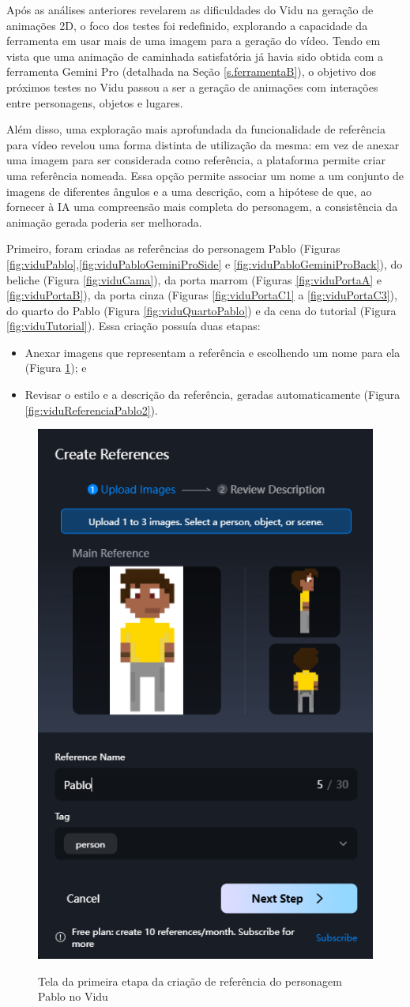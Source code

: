 

Após as análises anteriores revelarem as dificuldades do Vidu na geração de animações 2D, o foco dos testes foi redefinido, explorando a capacidade da ferramenta em usar mais de uma imagem para a geração do vídeo. Tendo em vista que uma animação de caminhada satisfatória já havia sido obtida com a ferramenta Gemini Pro (detalhada na Seção \ref{s.ferramentaB}), o objetivo dos próximos testes no Vidu passou a ser a geração de animações com interações entre personagens, objetos e lugares. 


Além disso, uma exploração mais aprofundada da funcionalidade de referência para vídeo revelou uma forma distinta de utilização da mesma: em vez de anexar uma imagem para ser considerada como referência, a plataforma permite criar uma referência nomeada. Essa opção permite associar um nome a um conjunto de imagens de diferentes ângulos e a uma descrição, com a hipótese de que, ao fornecer à IA uma compreensão mais completa do personagem, a consistência da animação gerada poderia ser melhorada.

Primeiro, foram criadas as referências do personagem Pablo (Figuras \ref{fig:viduPablo},\ref{fig:viduPabloGeminiProSide} e \ref{fig:viduPabloGeminiProBack}), do beliche (Figura \ref{fig:viduCama}), da porta marrom (Figuras \ref{fig:viduPortaA} e \ref{fig:viduPortaB}), da porta cinza (Figuras \ref{fig:viduPortaC1} a \ref{fig:viduPortaC3}), do quarto do Pablo (Figura \ref{fig:viduQuartoPablo}) e da cena do tutorial (Figura \ref{fig:viduTutorial}). Essa criação possuía duas etapas:
\begin{itemize}
    \item Anexar imagens que representam a referência e escolhendo um nome para ela (Figura \ref{fig:viduReferenciaPablo1}); e
    \item Revisar o estilo e a descrição da referência, geradas automaticamente (Figura \ref{fig:viduReferenciaPablo2}).
\end{itemize}

\begin{figure}
    \centering
    \caption{\small Tela da primeira etapa da criação de referência do personagem Pablo no Vidu}
    \includegraphics[width=0.3\linewidth]{figs/vidu/tela_referencia.PNG}
    \label{fig:viduReferenciaPablo1}

\end{figure}

